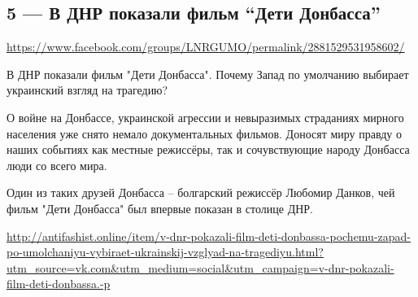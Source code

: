  
 
  
\clearpage
\subsection{5 --- В ДНР показали фильм ``Дети Донбасса''}
\url{https://www.facebook.com/groups/LNRGUMO/permalink/2881529531958602/}
  
В ДНР показали фильм "Дети Донбасса". Почему Запад по умолчанию выбирает
украинский взгляд на трагедию?

О войне на Донбассе, украинской агрессии и невыразимых страданиях мирного
населения уже снято немало документальных фильмов. Доносят миру правду о наших
событиях как местные режиссёры, так и сочувствующие народу Донбасса люди со
всего мира.

Один из таких друзей Донбасса – болгарский режиссёр Любомир Данков, чей фильм
"Дети Донбасса" был впервые показан в столице ДНР.

\url{http://antifashist.online/item/v-dnr-pokazali-film-deti-donbassa-pochemu-zapad-po-umolchaniyu-vybiraet-ukrainskij-vzglyad-na-tragediyu.html?utm_source=vk.com&utm_medium=social&utm_campaign=v-dnr-pokazali-film-deti-donbassa.-p}
